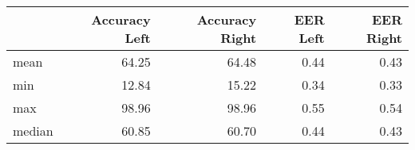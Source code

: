 \begin{tabular}{lrrrr}
\toprule
{} &  Accuracy Left &  Accuracy Right &  EER Left &  EER Right \\
\midrule
mean   &          64.25 &           64.48 &      0.44 &       0.43 \\
min    &          12.84 &           15.22 &      0.34 &       0.33 \\
max    &          98.96 &           98.96 &      0.55 &       0.54 \\
median &          60.85 &           60.70 &      0.44 &       0.43 \\
\bottomrule
\end{tabular}
